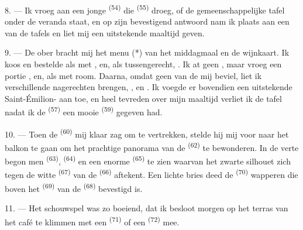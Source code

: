 8. --- Ik vroeg aan een jonge  \textsuperscript{(54)} die
 \textsuperscript{(55)} droeg, of de gemeenschappelijke tafel
onder de veranda staat, en op zijn bevestigend antwoord nam ik plaats aan een van de tafels en
liet mij een uitstekende maaltijd geven.


\VUsaut{4.0mm}
\VUsaut{3.0mm}

9. --- De ober bracht mij het menu (*) van het middagmaal en de wijnkaart. Ik koos en
bestelde als  met , en, als tussengerecht,
. Ik at geen , maar vroeg een portie
, en, als  met room. Daarna, omdat geen van
de  mij beviel, liet ik verschillende nagerechten brengen,
,  en
. Ik voegde er bovendien een uitstekende
Saint-Émilion- aan toe, en heel tevreden over mijn maaltijd verliet ik de tafel
nadat ik de  \textsuperscript{(57)} een mooie
 \textsuperscript{(59)} gegeven had.

10. --- Toen de  \textsuperscript{(60)} mij klaar zag om te vertrekken,
stelde hij mij voor naar het balkon te gaan om het prachtige panorama van de 
\textsuperscript{(62)} te bewonderen. In de verte begon men 
\textsuperscript{(63)},  \textsuperscript{(64)} en een enorme
 \textsuperscript{(65)} te zien waarvan het zwarte silhouet zich tegen de
witte  \textsuperscript{(67)} van de  \textsuperscript{(66)}
aftekent. Een lichte bries deed de  \textsuperscript{(70)} wapperen die boven het
 \textsuperscript{(69)} van de  \textsuperscript{(68)}
bevestigd is.

\VUsaut{3.0mm}
\VUsaut{3.0mm}

11. --- Het schouwspel was zo boeiend, dat ik besloot morgen op het terras van het café te
klimmen met een  \textsuperscript{(71)} of een
 \textsuperscript{(72)} mee.

